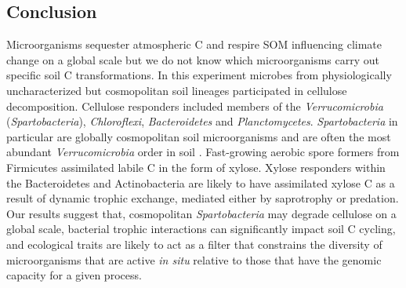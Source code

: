\subsection{Conclusion} 
Microorganisms sequester atmospheric C and respire SOM influencing climate
change on a global scale but we do not know which microorganisms carry out
specific soil C transformations. In this experiment microbes from
physiologically uncharacterized but cosmopolitan soil lineages participated in
cellulose decomposition. Cellulose responders included members of the
\textit{Verrucomicrobia} (\textit{Spartobacteria}), \textit{Chloroflexi},
\textit{Bacteroidetes} and \textit{Planctomycetes}. \textit{Spartobacteria} in
particular are globally cosmopolitan soil microorganisms and are often the most
abundant \textit{Verrucomicrobia} order in soil \citep{Bergmann_2011}.
Fast-growing aerobic spore formers from Firmicutes assimilated labile C in the
form of xylose. Xylose responders within the Bacteroidetes and Actinobacteria
are likely to have assimilated xylose C as a result of dynamic trophic
exchange, mediated either by saprotrophy or predation. Our results suggest
that, cosmopolitan \textit{Spartobacteria} may degrade cellulose on a global
scale, bacterial trophic interactions can significantly impact soil C cycling,
and ecological traits are likely to act as a filter that constrains the
diversity of microorganisms that are active \textit{in situ} relative to those
that have the genomic capacity for a given process.

